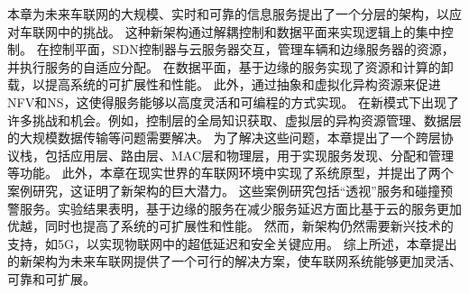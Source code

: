 本章为未来车联网的大规模、实时和可靠的信息服务提出了一个分层的架构，以应对车联网中的挑战。
这种新架构通过解耦控制和数据平面来实现逻辑上的集中控制。
在控制平面，SDN控制器与云服务器交互，管理车辆和边缘服务器的资源，并执行服务的自适应分配。
在数据平面，基于边缘的服务实现了资源和计算的卸载，以提高系统的可扩展性和性能。
此外，通过抽象和虚拟化异构资源来促进NFV和NS，这使得服务能够以高度灵活和可编程的方式实现。
在新模式下出现了许多挑战和机会。例如，控制层的全局知识获取、虚拟层的异构资源管理、数据层的大规模数据传输等问题需要解决。
为了解决这些问题，本章提出了一个跨层协议栈，包括应用层、路由层、MAC层和物理层，用于实现服务发现、分配和管理等功能。
此外，本章在现实世界的车联网环境中实现了系统原型，并提出了两个案例研究，这证明了新架构的巨大潜力。
这些案例研究包括“透视”服务和碰撞预警服务。实验结果表明，基于边缘的服务在减少服务延迟方面比基于云的服务更加优越，同时也提高了系统的可扩展性和性能。
然而，新架构仍然需要新兴技术的支持，如5G，以实现物联网中的超低延迟和安全关键应用。
综上所述，本章提出的新架构为未来车联网提供了一个可行的解决方案，使车联网系统能够更加灵活、可靠和可扩展。